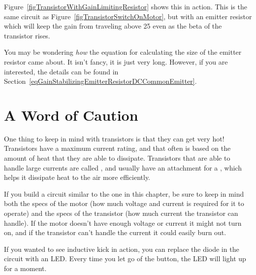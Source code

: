 Figure~\ref{figTransistorWithGainLimitingResistor} shows this in action.  
This is the same circuit as Figure~\ref{figTransistorSwitchOnMotor}, but with an emitter resistor which will keep the gain from traveling above 25 even as the beta of the transistor rises.


You may be wondering \emph{how} the equation for calculating the size of the emitter resistor came about.
It isn't fancy, it is just very long.
However, if you are interested, the details can be found in Section~\ref{eqGainStabilizingEmitterResistorDCCommonEmitter}.
\fi

\section{A Word of Caution}

One thing to keep in mind with transistors is that they can get very hot!
Transistors have a maximum current rating, and that often is based on the amount of heat that they are able to dissipate.
Transistors that are able to handle large currents are called , and usually have an attachment for a , which helps it dissipate heat to the air more efficiently.

If you build a circuit similar to the one in this chapter, be sure to keep in mind both the specs of the motor (how much voltage and current is required for it to operate) and the specs of the transistor (how much current the transistor can handle).
If the motor doesn't have enough voltage or current it might not turn on, and if the transistor can't handle the current it could easily burn out.

If you wanted to see inductive kick in action, you can replace the diode in the circuit with an LED.
Every time you let go of the button, the LED will light up for a moment.

\reviewsection

